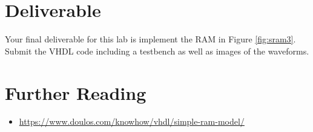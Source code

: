 \documentclass[a4paper, 11pt,oneside]{article}
\begin{document}
\section{Deliverable}
Your final deliverable for this lab is implement the RAM in Figure 
 \ref{fig:sram3}. Submit the VHDL code including a testbench as well as images 
of the waveforms.

\section{Further Reading}
\begin{itemize}
\item 
\href{https://www.doulos.com/knowhow/vhdl/simple-ram-model/}
{https://www.doulos.com/knowhow/vhdl/simple-ram-model/}
\end{itemize}





\nocite{*}
\end{document}
